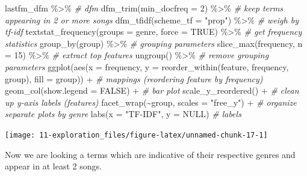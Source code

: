 \documentclass[
]{article}
\newenvironment{Shaded}{\begin{snugshade}}{\end{snugshade}}
\newcommand{\AttributeTok}[1]{\textcolor[rgb]{0.77,0.63,0.00}{#1}}
\newcommand{\CommentTok}[1]{\textcolor[rgb]{0.56,0.35,0.01}{\textit{#1}}}
\newcommand{\ConstantTok}[1]{\textcolor[rgb]{0.00,0.00,0.00}{#1}}
\newcommand{\DecValTok}[1]{\textcolor[rgb]{0.00,0.00,0.81}{#1}}
\newcommand{\FunctionTok}[1]{\textcolor[rgb]{0.00,0.00,0.00}{#1}}
\newcommand{\NormalTok}[1]{#1}
\newcommand{\SpecialCharTok}[1]{\textcolor[rgb]{0.00,0.00,0.00}{#1}}
\newcommand{\StringTok}[1]{\textcolor[rgb]{0.31,0.60,0.02}{#1}}
\begin{document}
\begin{Shaded}
\begin{Highlighting}[]
\NormalTok{lastfm\_dfm }\SpecialCharTok{\%\textgreater{}\%} \CommentTok{\# dfm}
  \FunctionTok{dfm\_trim}\NormalTok{(}\AttributeTok{min\_docfreq =} \DecValTok{2}\NormalTok{) }\SpecialCharTok{\%\textgreater{}\%} \CommentTok{\# keep terms appearing in 2 or more songs}
  \FunctionTok{dfm\_tfidf}\NormalTok{(}\AttributeTok{scheme\_tf =} \StringTok{"prop"}\NormalTok{) }\SpecialCharTok{\%\textgreater{}\%}  \CommentTok{\# weigh by tf{-}idf}
  \FunctionTok{textstat\_frequency}\NormalTok{(}\AttributeTok{groups =}\NormalTok{ genre, }\AttributeTok{force =} \ConstantTok{TRUE}\NormalTok{) }\SpecialCharTok{\%\textgreater{}\%} \CommentTok{\# get frequency statistics}
  \FunctionTok{group\_by}\NormalTok{(group) }\SpecialCharTok{\%\textgreater{}\%} \CommentTok{\# grouping parameters}
  \FunctionTok{slice\_max}\NormalTok{(frequency, }\AttributeTok{n =} \DecValTok{15}\NormalTok{) }\SpecialCharTok{\%\textgreater{}\%} \CommentTok{\# extract top features}
  \FunctionTok{ungroup}\NormalTok{() }\SpecialCharTok{\%\textgreater{}\%} \CommentTok{\# remove grouping parameters}
  \FunctionTok{ggplot}\NormalTok{(}\FunctionTok{aes}\NormalTok{(}\AttributeTok{x =}\NormalTok{ frequency, }\AttributeTok{y =} \FunctionTok{reorder\_within}\NormalTok{(feature, frequency, group), }\AttributeTok{fill =}\NormalTok{ group)) }\SpecialCharTok{+} \CommentTok{\# mappings (reordering feature by frequency)}
  \FunctionTok{geom\_col}\NormalTok{(}\AttributeTok{show.legend =} \ConstantTok{FALSE}\NormalTok{) }\SpecialCharTok{+} \CommentTok{\# bar plot}
  \FunctionTok{scale\_y\_reordered}\NormalTok{() }\SpecialCharTok{+} \CommentTok{\# clean up y{-}axis labels (features)}
  \FunctionTok{facet\_wrap}\NormalTok{(}\SpecialCharTok{\textasciitilde{}}\NormalTok{group, }\AttributeTok{scales =} \StringTok{"free\_y"}\NormalTok{) }\SpecialCharTok{+} \CommentTok{\# organize separate plots by genre}
  \FunctionTok{labs}\NormalTok{(}\AttributeTok{x =} \StringTok{"TF{-}IDF"}\NormalTok{, }\AttributeTok{y =} \ConstantTok{NULL}\NormalTok{) }\CommentTok{\# labels}
\end{Highlighting}
\end{Shaded}

\begin{center}\texttt{[image: 11-exploration\_files/figure-latex/unnamed-chunk-17-1]} \end{center}

Now we are looking a terms which are indicative of their respective genres and appear in at least 2 songs.
\end{document}
